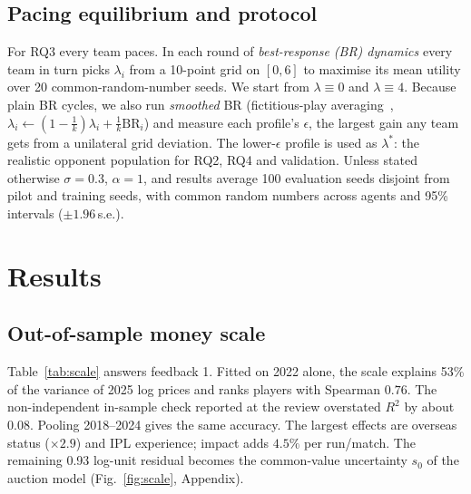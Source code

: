 \documentclass{article}
\newcommand{\1}{\mathbb{1}}
\begin{document}
\subsection{Pacing equilibrium and protocol}
For RQ3 every team paces. In each round of \emph{best-response (BR) dynamics} every team in turn picks $\lambda_i$ from a 10-point grid on $[0,6]$ to maximise its mean utility over 20 common-random-number seeds. We start from $\lambda\equiv0$ and $\lambda\equiv4$. Because plain BR cycles, we also run \emph{smoothed} BR (fictitious-play averaging~\citep{brown1951}, $\lambda_i\gets(1-\tfrac1k)\lambda_i+\tfrac1k\mathrm{BR}_i$) and measure each profile's $\epsilon$, the largest gain any team gets from a unilateral grid deviation. The lower-$\epsilon$ profile is used as $\lambda^\ast$: the realistic opponent population for RQ2, RQ4 and validation. Unless stated otherwise $\sigma=0.3$, $\alpha=1$, and results average 100 evaluation seeds disjoint from pilot and training seeds, with common random numbers across agents and 95\% intervals ($\pm1.96$\,s.e.).

\section{Results}
\label{sec:results}

\subsection{Out-of-sample money scale}\label{sec:r-scale}
\begin{table}[t]
\centering\small
\caption{Money scale~\eqref{eq:hedonic}: fitted on earlier auctions, evaluated on the 2025 auction (log price). MAE and bias in log units; the negative bias means 2025 prices were about 23\% below the purse-scaled prediction.}
\label{tab:scale}

\end{table}
Table~\ref{tab:scale} answers feedback 1. Fitted on 2022 alone, the scale explains 53\% of the variance of 2025 log prices and ranks players with Spearman $0.76$. The non-independent in-sample check reported at the review overstated $R^2$ by about 0.08. Pooling 2018--2024 gives the same accuracy. The largest effects are overseas status ($\times2.9$) and IPL experience; impact adds $4.5\%$ per run/match. The remaining 0.93 log-unit residual becomes the common-value uncertainty $s_0$ of the auction model (Fig.~\ref{fig:scale}, Appendix).
\end{document}
